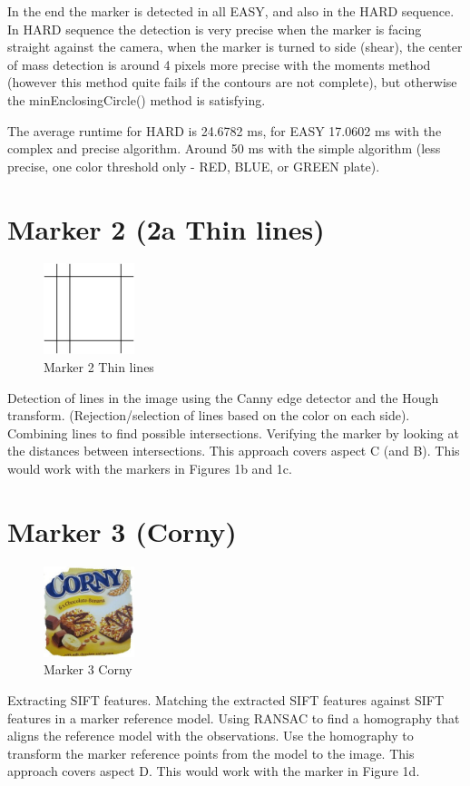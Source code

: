 In the end the marker is detected in all EASY, and also in the HARD sequence. In HARD sequence the detection is very precise when
the marker is facing straight against the camera, when the marker is turned to side (shear), the center of mass detection is around 4 pixels more precise with the moments method (however this method quite fails if the contours are not complete), but otherwise the minEnclosingCircle() method is satisfying. 

The average runtime for HARD is 24.6782 ms, for EASY 17.0602 ms with the complex and precise algorithm. Around 50 ms with the simple algorithm (less precise, one color threshold only - RED, BLUE, or GREEN plate).


\newpage
\section{Marker 2 (2a Thin lines)}

\begin{figure}[ht!]
	\centering
	\includegraphics[width=100px]{figures/Marker2a}
	\caption{Marker 2 Thin lines}
	\label{fig:markerLines}
\end{figure}

Detection of lines in the image using the Canny edge detector and the
Hough transform. (Rejection/selection of lines based on the color on
each side). Combining lines to find possible intersections. Verifying
the marker by looking at the distances between intersections. This
approach covers aspect C (and B). This would work with the markers
in Figures 1b and 1c.



\newpage
\section{Marker 3 (Corny)}

\begin{figure}[ht!]
	\centering
	\includegraphics[width=100px]{figures/Marker3}
	\caption{Marker 3 Corny}
	\label{fig:markerColor}
\end{figure}


Extracting SIFT features. Matching the extracted SIFT features against
SIFT features in a marker reference model. Using RANSAC to find
a homography that aligns the reference model with the observations.
Use the homography to transform the marker reference points from
the model to the image. This approach covers aspect D. This would
work with the marker in Figure 1d.
